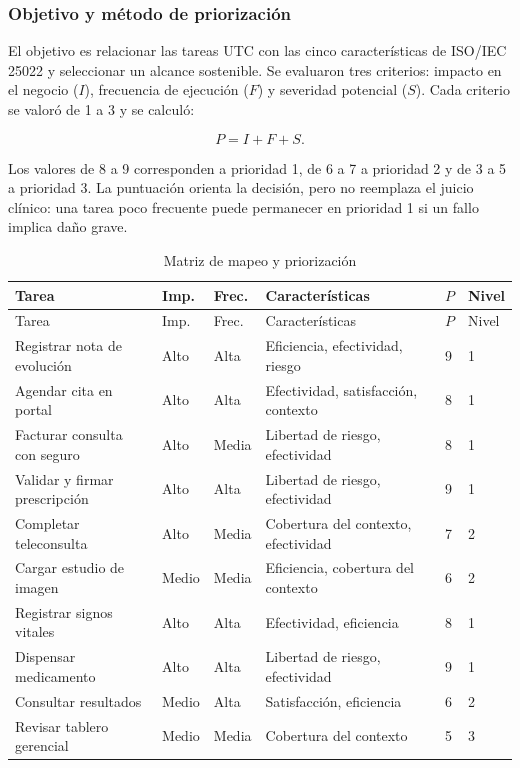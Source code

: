 
\subsubsection{Objetivo y método de priorización}

El objetivo es relacionar las tareas UTC con las cinco características de ISO/IEC 25022 y seleccionar un alcance sostenible. Se evaluaron tres criterios: impacto en el negocio ($I$), frecuencia de ejecución ($F$) y severidad potencial ($S$). Cada criterio se valoró de 1 a 3 y se calculó:

\begin{equation}
P = I + F + S.
\end{equation}

Los valores de 8 a 9 corresponden a prioridad 1, de 6 a 7 a prioridad 2 y de 3 a 5 a prioridad 3. La puntuación orienta la decisión, pero no reemplaza el juicio clínico: una tarea poco frecuente puede permanecer en prioridad 1 si un fallo implica daño grave.

\small
\begin{longtable}{@{}p{3.3cm}p{1.15cm}p{1.2cm}p{4.0cm}p{0.6cm}p{1.0cm}@{}}
\caption{Matriz de mapeo y priorización}\label{tab:priority}\\
\toprule
Tarea & Imp. & Frec. & Características & $P$ & Nivel \\
\midrule
\endfirsthead
\toprule
Tarea & Imp. & Frec. & Características & $P$ & Nivel \\
\midrule
\endhead
Registrar nota de evolución & Alto & Alta & Eficiencia, efectividad, riesgo & 9 & 1 \\
Agendar cita en portal & Alto & Alta & Efectividad, satisfacción, contexto & 8 & 1 \\
Facturar consulta con seguro & Alto & Media & Libertad de riesgo, efectividad & 8 & 1 \\
Validar y firmar prescripción & Alto & Alta & Libertad de riesgo, efectividad & 9 & 1 \\
Completar teleconsulta & Alto & Media & Cobertura del contexto, efectividad & 7 & 2 \\
Cargar estudio de imagen & Medio & Media & Eficiencia, cobertura del contexto & 6 & 2 \\
Registrar signos vitales & Alto & Alta & Efectividad, eficiencia & 8 & 1 \\
Dispensar medicamento & Alto & Alta & Libertad de riesgo, efectividad & 9 & 1 \\
Consultar resultados & Medio & Alta & Satisfacción, eficiencia & 6 & 2 \\
Revisar tablero gerencial & Medio & Media & Cobertura del contexto & 5 & 3 \\
\bottomrule
\end{longtable}
\normalsize


